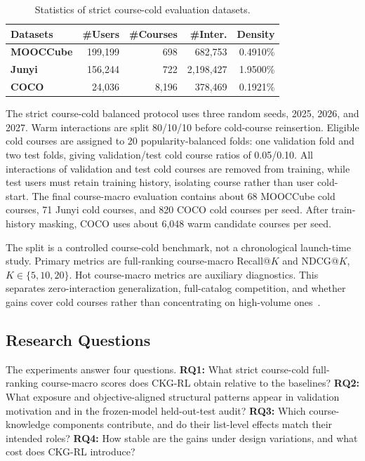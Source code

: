 \documentclass[letterpaper]{article}
\begin{document}
\begin{table}[t]
\centering
{
\small
\setlength{\tabcolsep}{4pt}
\begin{tabular}{lrrrr}
\toprule
\textbf{Datasets} & \textbf{\#Users} & \textbf{\#Courses} & \textbf{\#Inter.} & \textbf{Density} \\
\midrule
\textbf{MOOCCube} & 199,199 & 698 & 682,753 & 0.4910\% \\
\textbf{Junyi} & 156,244 & 722 & 2,198,427 & 1.9500\% \\
\textbf{COCO} & 24,036 & 8,196 & 378,469 & 0.1921\% \\
\bottomrule
\end{tabular}
}
\caption{Statistics of strict course-cold evaluation datasets.}
\label{tab:dataset-statistics}
\end{table}

The strict course-cold balanced protocol uses three random seeds, 2025, 2026, and 2027. Warm interactions are split 80/10/10 before cold-course reinsertion. Eligible cold courses are assigned to 20 popularity-balanced folds: one validation fold and two test folds, giving validation/test cold course ratios of 0.05/0.10. All interactions of validation and test cold courses are removed from training, while test users must retain training history, isolating course rather than user cold-start. The final course-macro evaluation contains about 68 MOOCCube cold courses, 71 Junyi cold courses, and 820 COCO cold courses per seed. After train-history masking, COCO uses about 6,048 warm candidate courses per seed.

The split is a controlled course-cold benchmark, not a chronological launch-time study. Primary metrics are full-ranking course-macro Recall@\(K\) and NDCG@\(K\), \(K \in \{5,10,20\}\). Hot course-macro metrics are auxiliary diagnostics. This separates zero-interaction generalization, full-catalog competition, and whether gains cover cold courses rather than concentrating on high-volume ones~\cite{bauer2024landscape,ekstrand2024distributional}.

\subsection{Research Questions}
The experiments answer four questions. \textbf{RQ1:} What strict course-cold full-ranking course-macro scores does CKG-RL obtain relative to the baselines? \textbf{RQ2:} What exposure and objective-aligned structural patterns appear in validation motivation and in the frozen-model held-out-test audit? \textbf{RQ3:} Which course-knowledge components contribute, and do their list-level effects match their intended roles? \textbf{RQ4:} How stable are the gains under design variations, and what cost does CKG-RL introduce?
\end{document}

